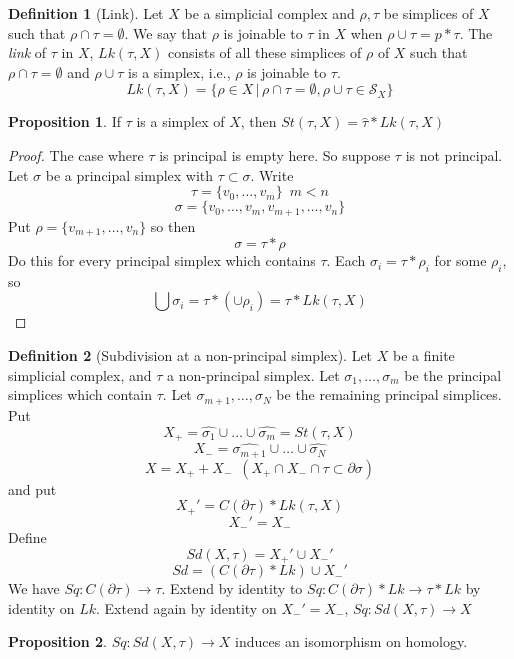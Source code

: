 \documentclass[a4paper,14pt]{extarticle}
\theoremstyle{definition}
\newtheorem*{definition}{Definition}
\newtheorem*{proposition}{Proposition}
\begin{document}
\begin{definition}[Link]
	Let $X$ be a simplicial complex and $\rho,\tau$ be simplices of $X$ such that 
	$\rho\cap\tau=\emptyset$. We say that $\rho$ is joinable to $\tau$ in $X$ when
	$\rho\cup\tau=p*\tau$. The \emph{link} of $\tau$ in $X$, $Lk(\tau,X)$ consists of all
	these simplices of $\rho$ of $X$ such that $\rho\cap\tau=\emptyset$ and $\rho\cup\tau$ is
	a simplex, i.e., $\rho$ is joinable to $\tau$.
	\[Lk(\tau, X)=\{\rho\in X\,|\, \rho\cap\tau=\emptyset, \rho\cup\tau\in\mathcal{S}_X\}\]
\end{definition}

\begin{proposition}
	If $\tau$ is a simplex of $X$, then $St(\tau,X)=\hat{\tau}*Lk(\tau,X)$
\end{proposition}

\begin{proof}
	The case where $\tau$ is principal is empty here. So suppose $\tau$ is not principal.
	Let $\sigma$ be a principal simplex with $\tau\subset\sigma$. Write
	\[\tau=\{v_0,\ldots,v_m\} \,\,\,m<n\] \[\sigma=\{v_0,\ldots,v_m,v_{m+1},\ldots,v_n\}\]
	Put $\rho=\{v_{m+1},\ldots,v_n\}$ so then \[\sigma=\tau*\rho\] Do this for every principal
	simplex which contains $\tau$. Each $\sigma_i=\tau*\rho_i$ for some $\rho_i$, so 
	\[\bigcup\sigma_i=\tau*(\cup\rho_i)=\tau*Lk(\tau,X)\]
\end{proof}

\begin{definition}[Subdivision at a non-principal simplex]
	Let $X$ be a finite simplicial complex, and $\tau$ a non-principal simplex.
	Let $\sigma_1,\ldots,\sigma_m$ be the principal simplices which contain $\tau$.
	Let $\sigma_{m+1},\ldots,\sigma_N$ be the remaining principal simplices.
	Put \[X_+=\hat{\sigma_1}\cup\ldots\cup\hat{\sigma_m}=St(\tau,X)\]
	\[X_-=\hat{\sigma_{m+1}}\cup\ldots\cup\hat{\sigma_N}\]
	\[X=X_++X_- \,\,\,(X_+\cap X_-\cap\tau\subset \partial\sigma)\]
	and put 
	\[X_+'=C(\partial\tau)*Lk(\tau,X)\]
	\[X_-'=X_-\] Define \[Sd(X,\tau)=X_+'\cup X_-'\] \[Sd=(C(\partial\tau)*Lk)\cup X_-'\]
	We have $Sq:C(\partial\tau)\rightarrow\tau$. Extend by identity to 
	$Sq:C(\partial\tau)*Lk\rightarrow\tau*Lk$ by identity on $Lk$. Extend again by identity
	on $X_-'=X_-$, $Sq:Sd(X,\tau)\rightarrow X$
\end{definition}

\begin{proposition}
	$Sq:Sd(X,\tau)\rightarrow X$ induces an isomorphism on homology.
\end{proposition}
\end{document}
